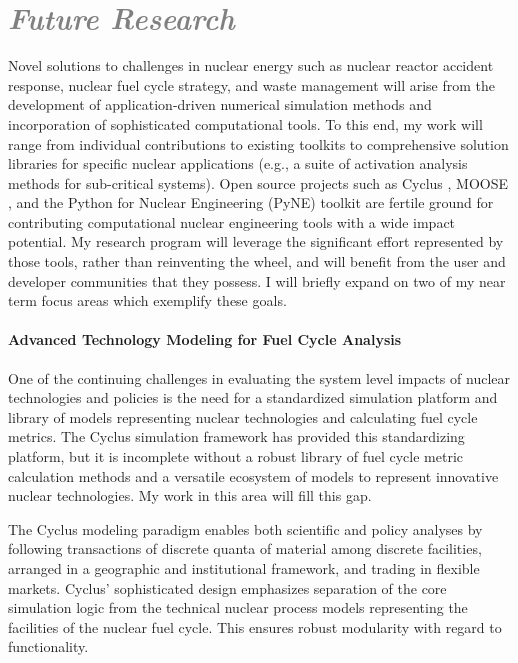 \documentclass[a4paper, 12pt]{article}
\begin{document}
\section*{\textcolor{gray}{\it Future Research}}
Novel solutions to challenges in nuclear energy such as nuclear reactor accident 
response, nuclear fuel cycle strategy, and waste management will arise from the  
development of application-driven numerical simulation methods and incorporation 
of sophisticated computational tools. To this end, my work will range from 
individual contributions to existing toolkits to comprehensive solution 
libraries for specific nuclear applications (e.g., a suite of activation 
analysis methods for sub-critical systems). Open source projects such as 
Cyclus \cite{huff_cyclus_2011}, MOOSE \cite{gaston_moose:_2009}, and the Python 
for Nuclear Engineering (PyNE) toolkit \cite{pyne_pyne_2011} are fertile ground 
for contributing computational nuclear engineering tools with a wide impact 
potential. My research program will leverage the significant effort represented 
by those tools, rather than reinventing the wheel, and will benefit from the 
user and developer communities that they possess.  I will briefly expand on two 
of my near term focus areas which exemplify these goals. 

\paragraph{Advanced Technology Modeling for Fuel Cycle Analysis} 

One of the continuing challenges in evaluating the system level impacts of 
nuclear technologies and policies is the need for a standardized simulation 
platform and library of models representing nuclear technologies and calculating 
fuel cycle metrics.  The Cyclus simulation framework 
has provided this standardizing platform, but it is incomplete without a 
robust library of fuel cycle metric calculation methods and a versatile ecosystem of 
models to represent innovative nuclear technologies. My work in this area will 
fill this gap. 

The Cyclus modeling paradigm enables both scientific and policy analyses by 
following transactions of discrete quanta of material among discrete facilities, 
arranged in a geographic and institutional framework, and trading in flexible 
markets. Cyclus' sophisticated design emphasizes separation of the core simulation logic 
from the technical nuclear process models representing the facilities of the 
nuclear fuel cycle. This ensures robust modularity with regard to functionality.  
\end{document}
